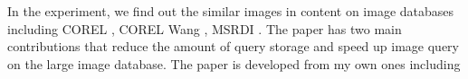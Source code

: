 \documentclass{amcs}
\begin{document}




In the experiment, we find out the similar images in content on image databases including COREL \cite{electronic:01}, COREL Wang \cite{electronic:02}, MSRDI \cite{electronic:03}. The paper has two main contributions that reduce the amount of query storage and speed up image query on the large image database. The paper is developed from my own ones including \cite{Thanh:2014a,Thanh:2014b}
\end{document}
